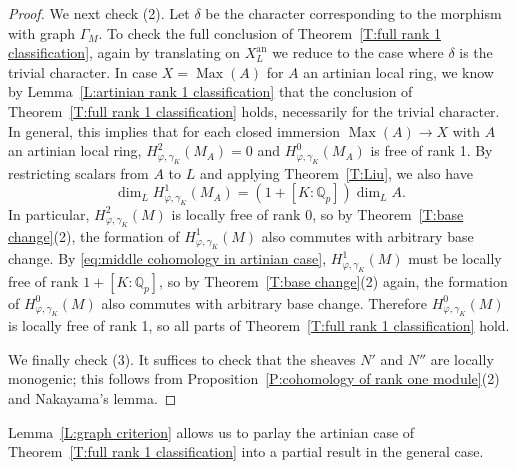 \documentclass[12pt]{article}
\theoremstyle{definition}
\numberwithin{equation}{theorem}
\newcommand{\QQ}{\mathbb{Q}}
\newcommand{\an}{\mathrm{an}}
\def\Qp{\QQ_p}
\DeclareMathOperator{\Max}{Max}
\begin{document}
\begin{proof}
We next check (2). Let $\delta$ be the character corresponding to the morphism with graph $\Gamma_M$. To check the full conclusion of Theorem~\ref{T:full rank 1 classification}, again by translating on $X^{\an}_L$ we reduce to the case where $\delta$ is the trivial character. In case $X = \Max(A)$ for $A$ an artinian local ring, we know by Lemma~\ref{L:artinian rank 1 classification} that the conclusion of Theorem~\ref{T:full rank 1 classification} holds, necessarily for the trivial character.
In general, this implies that for each closed immersion $\Max(A) \to X$ with $A$ an artinian local ring, $H^2_{\varphi,\gamma_K}(M_A) = 0$ and $H^0_{\varphi,\gamma_K}(M_A)$ is free of rank 1. By restricting scalars from $A$ to $L$ and applying Theorem~\ref{T:Liu}, we also have
\begin{equation} \label{eq:middle cohomology in artinian case}
\dim_L H^1_{\varphi,\gamma_K}(M_A) = (1 + [K:\Qp]) \dim_L A.
\end{equation}
In particular,
$H^2_{\varphi,\gamma_K}(M)$ is locally free of rank 0, so by 
Theorem~\ref{T:base change}(2), the formation of $H^1_{\varphi,\gamma_K}(M)$ also commutes with arbitrary base change. By \eqref{eq:middle cohomology in artinian case}, $H^1_{\varphi,\gamma_K}(M)$ must be locally free of rank $1 + [K:\Qp]$, so by Theorem~\ref{T:base change}(2) again, the formation of $H^0_{\varphi,\gamma_K}(M)$ also commutes with arbitrary base change. Therefore $H^0_{\varphi,\gamma_K}(M)$ is locally free of rank 1, so all parts of Theorem~\ref{T:full rank 1 classification} hold.

We finally check (3). It suffices to check that the sheaves $N'$ and $N''$ are locally monogenic; 
this follows from Proposition~\ref{P:cohomology of rank one module}(2) and Nakayama's lemma.
\end{proof}

Lemma~\ref{L:graph criterion} allows us to parlay the artinian case of
Theorem~\ref{T:full rank 1 classification} into a partial result in the general case.
\end{document}
